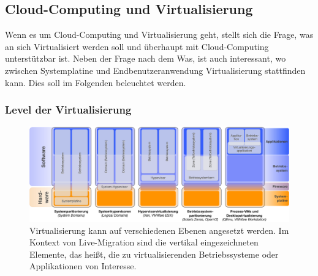 \subsection{Cloud-Computing und Virtualisierung}
\label{sec:ziel}


Wenn es um Cloud-Computing und Virtualisierung geht, stellt sich die
Frage, was an sich Virtualisiert werden soll und überhaupt mit
Cloud-Computing unterstützbar ist. Neben der Frage nach dem Was, ist
auch interessant, wo zwischen Systemplatine und Endbenutzeranwendung
Virtualisierung stattfinden kann. Dies soll im Folgenden beleuchtet werden.


\subsubsection{Level der Virtualisierung}
\label{sec:def-virtualisierung}

\begin{figure}[htbp]
  \centering
  \includegraphics[width=\textwidth]{images/Virtualisierungslevel}
  \caption{Virtualisierung kann auf verschiedenen Ebenen angesetzt werden. Im Kontext von Live-Migration sind die vertikal eingezeichneten Elemente, das heißt, die zu virtualisierenden Betriebssysteme oder Applikationen von Interesse. }
  \label{fig:levels}
\end{figure}

